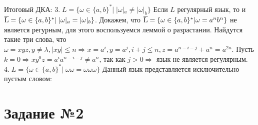 \documentclass[a4paper,12pt]{article}
\begin{document}
\endgroup
Итоговый ДКА:\newline
{}
\newline
$3.\;L = {\{\omega \in \{a,b\}^*|\;|\omega|_a \ne |\omega|_b\}}$\newline
Если $L$ регулярный язык, то и $\overline{\rm L} = {\{\omega \in \{a,b\}^*|\;|\omega|_a = |\omega|_b\}}$.\newline
Докажем, что $\overline{\rm L} = {\{\omega \in \{a,b\}^*|\omega = a^nb^n\}}$ не является регурным, для этого воспользуемся леммой о разрастании.
Найдутся такие три слова, что $\omega = xyz, y \ne \lambda, |xy|\leq n \Rightarrow x = a^i, y = a^j, i+j \leq n, z = a^{n-i-j}+a^n=a^{2n}$. Пусть $k=0 \Rightarrow xy^0z=a^ia^{n-i-j}\ne a^n$, так как $j > 0 \Rightarrow$ язык не является регулярным. \newline
\newline$4.\;L = {\{\omega \in \{a,b\}^*|\;\omega\omega = \omega\omega\omega \}}$\newline
Данный язык представляется исключительно пустым словом: \newline
\begin{figure}[h]
\centering
{}
\end{figure}\newline

\section*{\Huge Задание №2}
\end{document}

